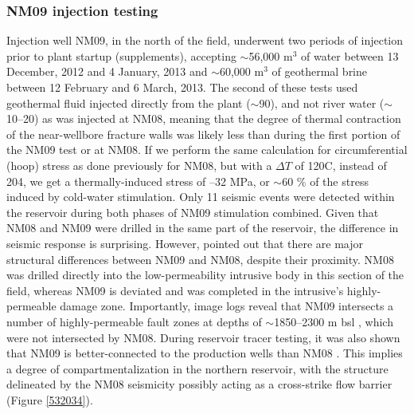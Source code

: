 \subsubsection{NM09 injection testing}
Injection well NM09, in the north of the field, underwent two periods of injection prior to plant startup (supplements), accepting $\sim$56,000 m$^3$ of water between 13 December, 2012 and 4 January, 2013 and $\sim$60,000 m$^3$ of geothermal brine between 12 February and 6 March, 2013. The second of these tests used geothermal fluid injected directly from the plant ($\sim$90), and not river water ($\sim$10--20) as was injected at NM08, meaning that the degree of thermal contraction of the near-wellbore fracture walls was likely less than during the first portion of the NM09 test or at NM08. If we perform the same calculation for circumferential (hoop) stress as done previously for NM08, but with a $\Delta{T}$ of 120\textdegree C, instead of 204\textdegree, we get a thermally-induced stress of --32 MPa, or $\sim$60 \% of the stress induced by cold-water stimulation. Only 11 seismic events were detected within the reservoir during both phases of NM09 stimulation combined. Given that NM08 and NM09 were drilled in the same part of the reservoir, the difference in seismic response is surprising. However, \citet{Clearwater_2015} pointed out that there are major structural differences between NM09 and NM08, despite their proximity. NM08 was drilled directly into the low-permeability intrusive body in this section of the field, whereas NM09 is deviated and was completed in the intrusive's highly-permeable damage zone. Importantly, image logs reveal that NM09 intersects a number of highly-permeable fault zones at depths of $\sim$1850--2300 m bsl \citep{nm09_report}, which were not intersected by NM08. During reservoir tracer testing, it was also shown that NM09 is better-connected to the production wells than NM08 \citep{buscarlet_2015}. This implies a degree of compartmentalization in the northern reservoir, with the structure delineated by the NM08 seismicity possibly acting as a cross-strike flow barrier \citep{buscarlet_2015} (Figure \ref{532034}).

